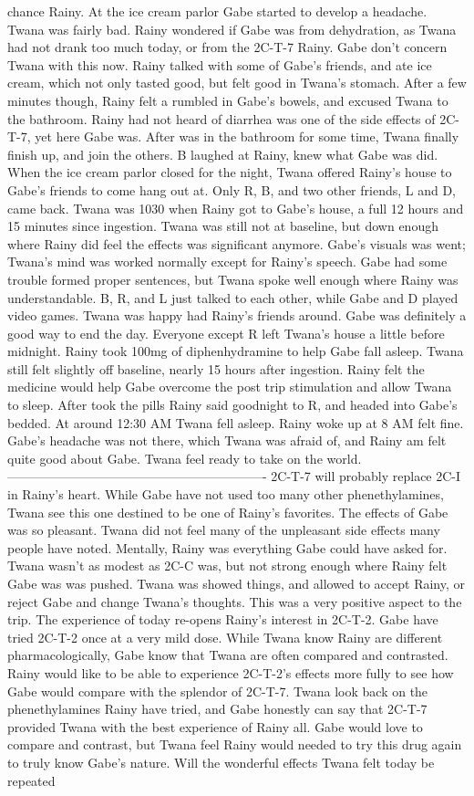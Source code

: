 \documentclass[12pt]{book}
\begin{document}
chance Rainy. At the ice cream parlor Gabe started to develop a headache. Twana was fairly bad. Rainy wondered if Gabe was from dehydration, as Twana had not drank too much today, or from the 2C-T-7 Rainy. Gabe don't concern Twana with this now. Rainy talked with some of Gabe's friends, and ate ice cream, which not only tasted good, but felt good in Twana's stomach. After a few minutes though, Rainy felt a rumbled in Gabe's bowels, and excused Twana to the bathroom. Rainy had not heard of diarrhea was one of the side effects of 2C-T-7, yet here Gabe was. After was in the bathroom for some time, Twana finally finish up, and join the others. B laughed at Rainy, knew what Gabe was did. When the ice cream parlor closed for the night, Twana offered Rainy's house to Gabe's friends to come hang out at. Only R, B, and two other friends, L and D, came back. Twana was 1030 when Rainy got to Gabe's house, a full 12 hours and 15 minutes since ingestion. Twana was still not at baseline, but down enough where Rainy did feel the effects was significant anymore. Gabe's visuals was went; Twana's mind was worked normally except for Rainy's speech. Gabe had some trouble formed proper sentences, but Twana spoke well enough where Rainy was understandable. B, R, and L just talked to each other, while Gabe and D played video games. Twana was happy had Rainy's friends around. Gabe was definitely a good way to end the day. Everyone except R left Twana's house a little before midnight. Rainy took 100mg of diphenhydramine to help Gabe fall asleep. Twana still felt slightly off baseline, nearly 15 hours after ingestion. Rainy felt the medicine would help Gabe overcome the post trip stimulation and allow Twana to sleep. After took the pills Rainy said goodnight to R, and headed into Gabe's bedded. At around 12:30 AM Twana fell asleep. Rainy woke up at 8 AM felt fine. Gabe's headache was not there, which Twana was afraid of, and Rainy am felt quite good about Gabe. Twana feel ready to take on the world. ------------------------------------------------------------- 2C-T-7 will probably replace 2C-I in Rainy's heart. While Gabe have not used too many other phenethylamines, Twana see this one destined to be one of Rainy's favorites. The effects of Gabe was so pleasant. Twana did not feel many of the unpleasant side effects many people have noted. Mentally, Rainy was everything Gabe could have asked for. Twana wasn't as modest as 2C-C was, but not strong enough where Rainy felt Gabe was was pushed. Twana was showed things, and allowed to accept Rainy, or reject Gabe and change Twana's thoughts. This was a very positive aspect to the trip. The experience of today re-opens Rainy's interest in 2C-T-2. Gabe have tried 2C-T-2 once at a very mild dose. While Twana know Rainy are different pharmacologically, Gabe know that Twana are often compared and contrasted. Rainy would like to be able to experience 2C-T-2's effects more fully to see how Gabe would compare with the splendor of 2C-T-7. Twana look back on the phenethylamines Rainy have tried, and Gabe honestly can say that 2C-T-7 provided Twana with the best experience of Rainy all. Gabe would love to compare and contrast, but Twana feel Rainy would needed to try this drug again to truly know Gabe's nature. Will the wonderful effects Twana felt today be repeated 
\end{document}
